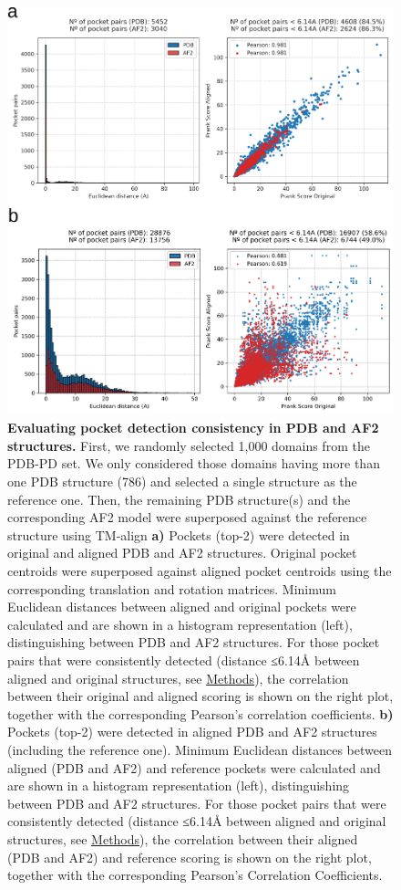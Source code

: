 \begin{figure}[htbp]
  \centering
  \includegraphics[width=0.7\linewidth]{figures/PocketVec/Supplementary/FigS17.png} 
  \caption{
    \textbf{Evaluating pocket detection consistency in PDB and AF2 structures.}
    First, we randomly selected 1,000 domains from the PDB-PD set. We only considered those domains having more than one PDB structure (786) and selected a single structure as the reference one.  Then, the remaining PDB structure(s) and the corresponding AF2 model were superposed against the reference structure using TM-align
    \textbf{a)} Pockets (top-2) were detected in original and aligned PDB and AF2 structures. Original pocket centroids were superposed against aligned pocket centroids using the corresponding translation and rotation matrices. Minimum Euclidean distances between aligned and original pockets were calculated and are shown in a histogram representation (left), distinguishing between PDB and AF2 structures. For those pocket pairs that were consistently detected (distance ≤6.14Å between aligned and original structures, see \hyperref[PocketVec_Methods]{Methods}), the correlation between their original and aligned scoring is shown on the right plot, together with the corresponding Pearson’s correlation coefficients.
    \textbf{b)} Pockets (top-2) were detected in aligned PDB and AF2 structures (including the reference one). Minimum Euclidean distances between aligned (PDB and AF2) and reference pockets were calculated and are shown in a histogram representation (left), distinguishing between PDB and AF2 structures. For those pocket pairs that were consistently detected (distance ≤6.14Å between aligned and original structures, see \hyperref[PocketVec_Methods]{Methods}), the correlation between their aligned (PDB and AF2) and reference scoring is shown on the right plot, together with the corresponding Pearson’s Correlation Coefficients.
  }
  \label{PocketVec_FigS17}
\end{figure}




